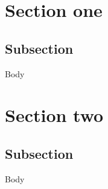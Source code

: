 
\section{Section one}

    \subsection{Subsection}

        Body

\section{Section two}

    \subsection{Subsection}

        Body
